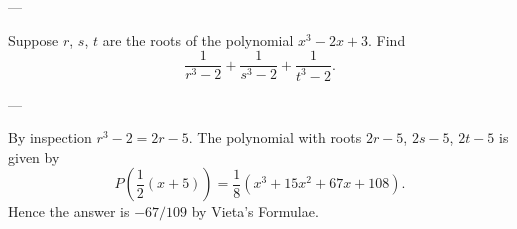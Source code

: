 
---

Suppose $r$, $s$, $t$ are the roots of the polynomial $x^3-2x+3$. Find \[\frac1{r^3-2}+\frac1{s^3-2}+\frac1{t^3-2}.\]

---

By inspection $r^3-2=2r-5$. The polynomial with roots $2r-5$, $2s-5$, $2t-5$ is given by \[P\left(\frac12(x+5)\right)=\frac18\left(x^3+15x^2+67x+108\right).\]
Hence the answer is $-67/109$ by Vieta's Formulae.

